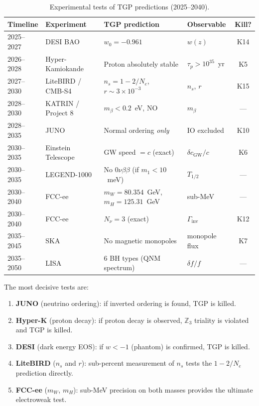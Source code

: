 \documentclass[aps,prd,twocolumn,superscriptaddress,showpacs,
  nofootinbib,floatfix,longbibliography]{revtex4-2}
\newcommand{\ZZ}{\mathbb{Z}}
\begin{document}
\begin{table}[tp]
\caption{Experimental tests of TGP predictions (2025--2040).}\label{tab:roadmap}
\begin{ruledtabular}
\begin{tabular}{llllc}
Timeline & Experiment & TGP prediction & Observable & Kill? \\
\hline
2025--2027 & DESI BAO & $w_0 = -0.961$ & $w(z)$ & K14 \\
2026--2028 & Hyper-Kamiokande & Proton absolutely stable & $\tau_p > 10^{35}$~yr & K5 \\
2027--2030 & LiteBIRD / CMB-S4 & $n_s = 1 - 2/N_e$, $r \sim 3\!\times\!10^{-3}$ & $n_s$, $r$ & K15 \\
2028--2030 & KATRIN / Project 8 & $m_\beta < 0.2$~eV, NO & $m_\beta$ & --- \\
2028--2035 & JUNO & Normal ordering \emph{only} & IO excluded & K10 \\
2030--2035 & Einstein Telescope & GW speed $= c$ (exact) & $\delta c_\mathrm{GW}/c$ & K6 \\
2030--2035 & LEGEND-1000 & No $0\nu\beta\beta$ (if $m_1 < 10$~meV) & $T_{1/2}$ & --- \\
2030--2040 & FCC-ee & $m_W = 80.354$~GeV, $m_H = 125.31$~GeV & sub-MeV & --- \\
2030--2040 & FCC-ee & $N_\nu = 3$ (exact) & $\Gamma_\mathrm{inv}$ & K12 \\
2035--2045 & SKA & No magnetic monopoles & monopole flux & K7 \\
2035--2050 & LISA & 6 BH types (QNM spectrum) & $\delta f/f$ & --- \\
\end{tabular}
\end{ruledtabular}
\end{table}

The most decisive tests are:
\begin{enumerate}
\item \textbf{JUNO} (neutrino ordering): if inverted ordering is found,
  TGP is killed.
\item \textbf{Hyper-K} (proton decay): if proton decay is observed,
  $\ZZ_3$ triality is violated and TGP is killed.
\item \textbf{DESI} (dark energy EOS): if $w < -1$ (phantom) is confirmed,
  TGP is killed.
\item \textbf{LiteBIRD} ($n_s$ and $r$): sub-percent measurement of $n_s$
  tests the $1 - 2/N_e$ prediction directly.
\item \textbf{FCC-ee} ($m_W$, $m_H$): sub-MeV precision on both masses
  provides the ultimate electroweak test.
\end{enumerate}
\end{document}
